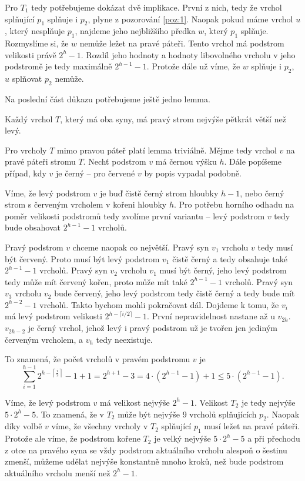 \begin{dukaz}
Pro $T_1$ tedy potřebujeme dokázat dvě implikace. První z nich, tedy že vrchol
splňující $p_1$ splňuje i $p_2$, plyne z pozorování \ref{poz:1}. Naopak pokud
máme vrchol $u$, který nesplňuje $p_1$, najdeme jeho nejbližšího předka $w$,
který $p_1$ splňuje. Rozmyslíme si, že $w$ nemůže ležet na pravé páteři. Tento vrchol má podstrom velikosti právě $2^{h}-1$. Rozdíl
jeho hodnoty a hodnoty libovolného vrcholu v jeho podstromě je tedy maximálně
$2^{h-1}-1$. Protože dále už víme, že $w$ splňuje i $p_2$, $u$ splňovat $p_2$
nemůže.

Na poslední část důkazu potřebujeme ještě jedno lemma.

\begin{lemma}
Každý vrchol $T$, který má oba syny, má pravý strom nejvýše pětkrát větší než levý.
\end{lemma}
\begin{dukaz}
Pro vrcholy $T$ mimo pravou páteř platí lemma triviálně. Mějme tedy vrchol $v$ na pravé páteři stromu $T$. Nechť podstrom $v$ má černou výšku $h$. Dále popíšeme případ, kdy $v$ je černý -- pro červené $v$ by popis vypadal podobně. 

Víme, že levý podstrom $v$ je buď čistě černý strom hloubky $h-1$, nebo černý strom s červeným vrcholem v kořeni hloubky $h$. Pro potřebu horního odhadu na poměr velikosti podstromů tedy zvolíme první variantu -- levý podstrom $v$ tedy bude obsahovat $2^{h-1} -1$ vrcholů. 

Pravý podstrom $v$ chceme naopak co největší. Pravý syn $v_1$ vrcholu $v$ tedy musí být červený. Proto musí být levý podstrom $v_1$ čistě černý a tedy obsahuje také $2^{h-1} -1$ vrcholů. Pravý syn $v_2$ vrcholu $v_1$ musí být černý, jeho levý podstrom tedy může mít červený kořen, proto může mít také $2^{h-1} -1$ vrcholů. Pravý syn $v_3$ vrcholu $v_2$ bude červený, jeho levý podstrom tedy čistě černý a tedy bude mít $2^{h-2}-1$ vrcholů. Takto bychom mohli pokračovat dál. Dojdeme k tomu, že $v_i$ má levý podstrom velikosti $2^{h-\lceil i/2\rceil} -1$. První nepravidelnost nastane až u $v_{2h}$. $v_{2h-2}$ je černý vrchol, jehož levý i pravý podstrom už je tvořen jen jediným červeným vrcholem, a $v_h$ tedy neexistuje.

To znamená, že počet vrcholů v pravém podstromu $v$ je $$\sum_{i=1}^{h-1}2^{h-\left\lceil \frac i2\right\rceil} -1 +1 = 2^{h+1}-3 = 4\cdot (2^{h-1}-1) +1 \leq 5\cdot(2^{h-1}-1).$$

\end{dukaz}

Víme, že levý podstrom $v$ má velikost nejvýše $2^h-1$. Velikost $T_2$ je tedy nejvýše $5\cdot 2^h - 5$. To znamená, že v $T_2$ může být nejvýše 9 vrcholů splňujících $p_2$. Naopak díky volbě $v$ víme, že všechny vrcholy v $T_2$ splňující $p_1$ musí ležet na pravé páteři. Protože ale víme, že podstrom kořene $T_2$ je velký nejvýše $5\cdot 2^h-5$ a při přechodu z otce na pravého syna se vždy podstrom aktuálního vrcholu alespoň o šestinu zmenší, můžeme udělat nejvýše konstantně mnoho kroků, než bude podstrom aktuálního vrcholu menší než $2^h-1$. 
\end{dukaz}

